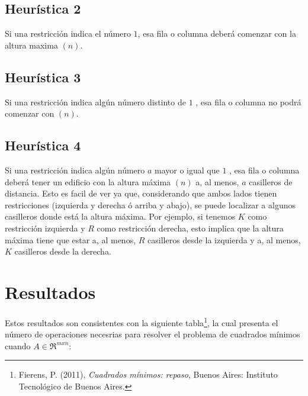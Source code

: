 \documentclass[%
	final,
	reprint,
	notitlepage,
	narroweqnarray,
	inline,
	twoside,
	invited
	]{ieee}
\begin{document}
\subsection{Heurística 2}

\par Si una restricción indica el número $1$, esa fila o columna deberá comenzar con la altura maxima $(n)$.

\subsection{Heurística 3}

\par Si una restricción indica algún número distinto de $1$ , esa fila o columna no podrá comenzar con $(n)$.

\subsection{Heurística 4}

\par Si una restricción indica algún número $a$ mayor o igual que $1$ , esa fila o columna deberá tener un edificio con la altura máxima $(n)$ a, al menos, $a$ casilleros de distancia. Esto es facil de ver ya que, considerando que ambos lados tienen restricciones (izquierda y derecha ó arriba y abajo), se puede localizar a algunos casilleros donde está la altura máxima. Por ejemplo, si tenemos $K$ como restricción izquierda y $R$ como restricción derecha, esto implica que la altura máxima tiene que estar a, al menos, $R$ casilleros desde la izquierda y a, al menos, $K$ casilleros desde la derecha.

\section{Resultados}


Estos resultados son consistentes con la siguiente tabla\footnote{Fierens, P. (2011), \emph{Cuadrados mínimos: repaso}, Buenos Aires: Instituto Tecnológico de Buenos Aires.}, la cual presenta el número de operaciones necesrias para resolver el problema de cuadrados mínimos cuando $A \in \Re ^{mxn}$:
\end{document}
